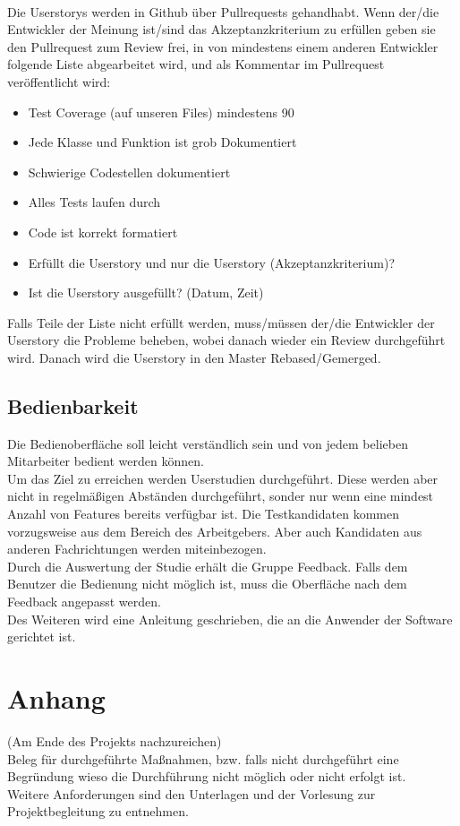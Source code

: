 \documentclass[accentcolor=tud9c,12pt,paper=a4]{tudreport}
\begin{document}
			\\[5pt]
			Die Userstorys werden in Github über Pullrequests gehandhabt. Wenn der/die 
			Entwickler der Meinung ist/sind das Akzeptanzkriterium zu erfüllen geben sie 
			den Pullrequest zum Review frei, in von mindestens einem anderen Entwickler 
			folgende Liste abgearbeitet wird, und als Kommentar im Pullrequest 
			veröffentlicht wird:
			\begin{itemize}	
				\item Test Coverage (auf unseren Files) mindestens 90%
				\item Jede Klasse und Funktion ist grob Dokumentiert
				\item Schwierige Codestellen dokumentiert
				\item Alles Tests laufen durch
				\item Code ist korrekt formatiert
				\item  Erfüllt die Userstory und nur die Userstory (Akzeptanzkriterium)?
				\item Ist die Userstory ausgefüllt? (Datum, Zeit)
			\end{itemize}
			Falls Teile der Liste nicht erfüllt werden, muss/müssen der/die Entwickler 
			der Userstory die Probleme beheben, wobei danach wieder ein Review 
			durchgeführt wird. Danach wird die Userstory in den Master Rebased/Gemerged.
		
		\section{Bedienbarkeit}
			Die Bedienoberfläche soll leicht verständlich sein und von jedem
			belieben Mitarbeiter bedient werden können.
			\\[5pt]
			Um das Ziel zu erreichen werden Userstudien durchgeführt.
			Diese werden aber nicht in regelmäßigen Abständen durchgeführt,
			sonder nur wenn eine mindest Anzahl von Features bereits
			verfügbar ist. Die Testkandidaten kommen vorzugsweise aus dem
			Bereich des Arbeitgebers. Aber auch Kandidaten aus anderen
			Fachrichtungen werden miteinbezogen.
			\\[5pt]
			Durch die Auswertung der Studie erhält die Gruppe Feedback.
			Falls dem Benutzer die Bedienung nicht möglich ist, muss die
			Oberfläche nach dem Feedback angepasst werden.
			\\[5pt]
			Des Weiteren wird eine Anleitung geschrieben, die an die Anwender der Software
			gerichtet ist.

\appendix
	\chapter{Anhang}
		(Am Ende des Projekts nachzureichen)\\
		Beleg für durchgeführte Maßnahmen, bzw. falls nicht durchgeführt eine Begründung wieso die Durchführung nicht möglich oder nicht erfolgt ist. \\
		Weitere Anforderungen sind den Unterlagen und der Vorlesung zur Projektbegleitung zu entnehmen.
\end{document}
